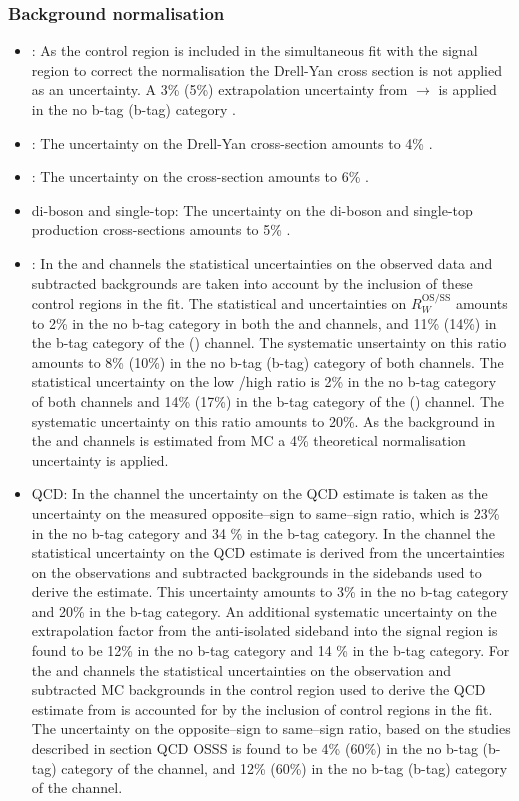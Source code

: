 \subsubsection*{Background normalisation}
\begin{itemize}
\setlength{\itemsep}{-\baselineskip}
\item \Ztautau: As the \Zmm control region is included in the simultaneous
fit with the signal region to correct the \Ztautau normalisation
the Drell-Yan cross section is not applied as an uncertainty. A 3\% (5\%)
extrapolation uncertainty from \Zmm $\rightarrow$ \Ztautau is applied in 
the no b-tag (b-tag) category \cite{CMS-PAS-HIG-16-037}.
\item \Zellell: The uncertainty on the Drell-Yan cross-section
amounts to 4\% \cite{CMS-PAS-HIG-16-037}.
\item \ttbar: The uncertainty on the \ttbar cross-section amounts
to 6\% \cite{CMS-PAS-HIG-16-037}.
\item di-boson and single-top: The uncertainty on the di-boson and
single-top production cross-sections amounts to 5\% \cite{CMS-PAS-HIG-16-037}.
\item \Wjets: In the \mutau and \etau channels the statistical uncertainties
on the observed data and subtracted backgrounds are taken into account by
the inclusion of these control regions in the fit. The statistical and 
uncertainties on $R_{W}^{\text{OS/SS}}$ amounts to 2\% in the no b-tag
category in both the \etau and \mutau channels, and 11\% (14\%) in the b-tag
category of the \mutau (\etau) channel. The systematic unsertainty on
this ratio amounts to 8\% (10\%) in the no b-tag (b-tag) category of both channels.
The statistical uncertainty on the low \mT/high \mT ratio is 2\% in the no b-tag
category of both channels and 14\% (17\%) in the b-tag category of the \mutau (\etau) channel.
The systematic uncertainty on this ratio amounts to 20\%. As the \Wjets background
in the \tautau and \emu channels is estimated from \ac{MC} a 4\% theoretical
normalisation uncertainty is applied.
\item QCD: In the \emu channel the uncertainty on the QCD estimate
is taken as the uncertainty on the measured opposite--sign to same--sign
ratio, which is 23\% in the no b-tag category and 34 \% in the b-tag category. In the
\tautau channel the statistical uncertainty on the QCD estimate is derived from
the uncertainties on the observations and subtracted backgrounds in the
sidebands used to derive the estimate. This uncertainty amounts to 3\% in the no b-tag
category and 20\% in the b-tag category. An additional systematic uncertainty on the
extrapolation factor from the anti-isolated sideband into the signal region is found
to be 12\% in the no b-tag category and 14 \% in the b-tag category. For the \etau and
\mutau channels the statistical
uncertainties on the observation and subtracted \ac{MC} backgrounds in the control
region used to derive the QCD estimate from is accounted for by the inclusion of control
regions in the fit. The uncertainty on the opposite--sign to same--sign ratio, based on
the studies described in section QCD OSSS is found to be 4\% (60\%) in the 
no b-tag (b-tag) category of the \mutau channel, and 12\% (60\%) in the no b-tag (b-tag) category
of the \etau channel. 
\end{itemize}
